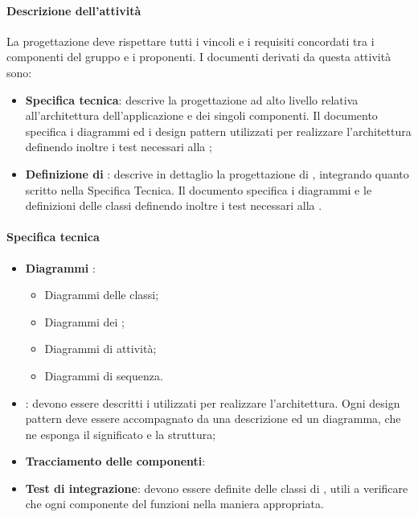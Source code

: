  \paragraph{Descrizione dell'attività}
La progettazione deve rispettare tutti i vincoli e i requisiti concordati tra i componenti del gruppo
e i proponenti. I documenti derivati da questa attività sono:
\begin{itemize}
	\item \textbf{Specifica tecnica}: descrive la progettazione ad alto livello relativa all'architettura dell'applicazione
e dei singoli componenti. Il documento specifica i diagrammi  ed i design
pattern utilizzati per realizzare l'architettura definendo inoltre i test necessari alla ;
	\item \textbf{Definizione di }: descrive in dettaglio la progettazione di , integrando
quanto scritto nella Specifica Tecnica. Il documento specifica i diagrammi  e le
definizioni delle classi definendo inoltre i test necessari alla .
\end{itemize}
 \paragraph{Specifica tecnica}
\begin{itemize} 
	\item \textbf{Diagrammi }:
	\begin{itemize}
	\item Diagrammi delle classi;
	\item Diagrammi dei ;
	\item Diagrammi di attività;
	\item Diagrammi di sequenza.
	\end{itemize}
	\item \textbf{}: devono essere descritti i  utilizzati per realizzare l'architettura. Ogni design
pattern deve essere accompagnato da una descrizione ed un diagramma, che ne esponga il
significato e la struttura;
	\item \textbf{Tracciamento delle componenti}:
	\item \textbf{Test di integrazione}: devono essere definite delle classi di , utili a verificare che ogni componente del
 funzioni nella maniera appropriata.
\end{itemize}
